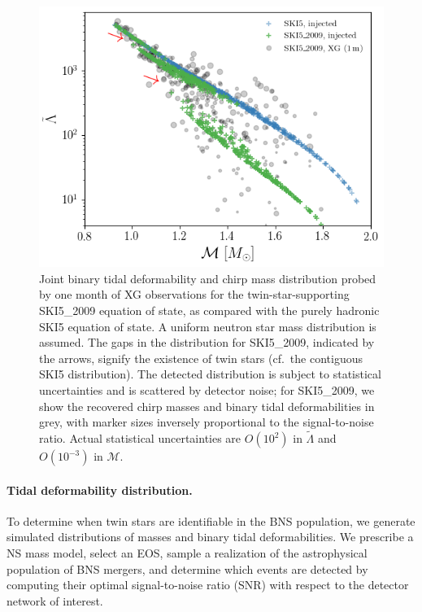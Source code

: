 \documentclass[aps,prl,twocolumn,superscriptaddress,footinbib]{revtex4-1}
\begin{document}
\begin{figure}[t]
    \centering
    \includegraphics[width=0.9\columnwidth,trim={5 5 5 5},clip]{SKI52009_pop.png}
    \caption{Joint binary tidal deformability and chirp mass distribution probed by one month of XG observations for the twin-star-supporting SKI5\_2009 equation of state, as compared with the purely hadronic SKI5 equation of state. A uniform neutron star mass distribution is assumed. The gaps in the distribution for SKI5\_2009, indicated by the arrows, signify the existence of twin stars (cf.~the contiguous SKI5 distribution). The detected distribution is subject to statistical uncertainties and is scattered by detector noise; for SKI5\_2009, we show the recovered chirp masses and binary tidal deformabilities in grey, with marker sizes inversely proportional to the signal-to-noise ratio. Actual statistical uncertainties are $O(10^2)$ in $\tilde{\Lambda}$ and $O(10^{-3})$ in $\mathcal{M}$.}
    \label{fig:lambdapop}
\end{figure}

\paragraph{Tidal deformability distribution.}\label{Sec_BNSPop}
To determine when twin stars are identifiable in the BNS population, we generate simulated distributions of masses and binary tidal deformabilities. We prescribe a NS mass model, select an EOS, sample a realization of the astrophysical population of BNS mergers, and determine which events are detected by computing their optimal signal-to-noise ratio (SNR) with respect to the detector network of interest.
\end{document}
